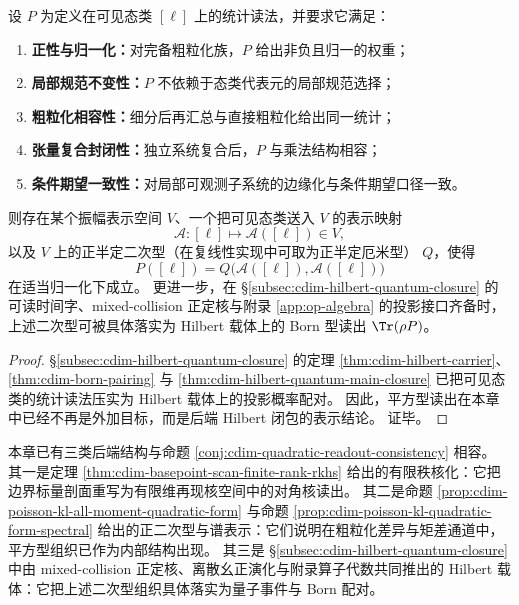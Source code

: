 \begin{proposition}\label{conj:cdim-quadratic-readout-consistency}
设 \(P\) 为定义在可见态类 \([\ell]\) 上的统计读法，并要求它满足：
\begin{enumerate}
  \item \textbf{正性与归一化：}对完备粗粒化族，\(P\) 给出非负且归一的权重；
  \item \textbf{局部规范不变性：}\(P\) 不依赖于态类代表元的局部规范选择；
  \item \textbf{粗粒化相容性：}细分后再汇总与直接粗粒化给出同一统计；
  \item \textbf{张量复合封闭性：}独立系统复合后，\(P\) 与乘法结构相容；
  \item \textbf{条件期望一致性：}对局部可观测子系统的边缘化与条件期望口径一致。
\end{enumerate}
则存在某个振幅表示空间 \(V\)、一个把可见态类送入 \(V\) 的表示映射
\[
\mathcal A:[\ell]\longmapsto \mathcal A([\ell])\in V,
\]
以及 \(V\) 上的正半定二次型（在复线性实现中可取为正半定厄米型） \(Q\)，使得
\[
P([\ell])=Q\bigl(\mathcal A([\ell]),\mathcal A([\ell])\bigr)
\]
在适当归一化下成立。
更进一步，在 \S\ref{subsec:cdim-hilbert-quantum-closure} 的可读时间字、mixed-collision 正定核与附录 \ref{app:op-algebra} 的投影接口齐备时，上述二次型可被具体落实为 Hilbert 载体上的 Born 型读出 \(\Tr(\rho P)\)。
\end{proposition}
\begin{proof}
\S\ref{subsec:cdim-hilbert-quantum-closure} 的定理 \ref{thm:cdim-hilbert-carrier}、\ref{thm:cdim-born-pairing} 与 \ref{thm:cdim-hilbert-quantum-main-closure} 已把可见态类的统计读法压实为 Hilbert 载体上的投影概率配对。
因此，平方型读出在本章中已经不再是外加目标，而是后端 Hilbert 闭包的表示结论。
证毕。
\end{proof}

\begin{remark}[与现有核化接口的兼容性]\label{rem:cdim-quadratic-readout-kernel-interface}
本章已有三类后端结构与命题 \ref{conj:cdim-quadratic-readout-consistency} 相容。
其一是定理 \ref{thm:cdim-basepoint-scan-finite-rank-rkhs} 给出的有限秩核化：它把边界标量剖面重写为有限维再现核空间中的对角核读出。
其二是命题 \ref{prop:cdim-poisson-kl-all-moment-quadratic-form} 与命题 \ref{prop:cdim-poisson-kl-quadratic-form-spectral} 给出的正二次型与谱表示：它们说明在粗粒化差异与矩差通道中，平方型组织已作为内部结构出现。
其三是 \S\ref{subsec:cdim-hilbert-quantum-closure} 中由 mixed-collision 正定核、离散幺正演化与附录算子代数共同推出的 Hilbert 载体：它把上述二次型组织具体落实为量子事件与 Born 配对。
\end{remark}

